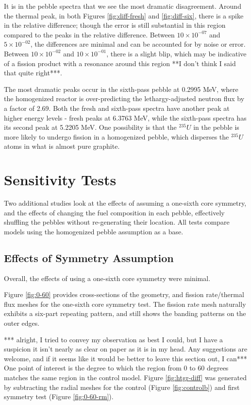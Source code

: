 It is in the pebble spectra that we see the most dramatic disagreement.  Around the thermal peak, in both Figures \ref{fig:diff-fresh} and \ref{fig:diff-six}, there is a spike in the relative difference; though the error is still substantial in this region compared to the peaks in the relative difference.  Between $10\times10^{-07}$ and $5\times10^{-02}$, the differences are minimal and can be accounted for by noise or error.  Between $10\times10^{-02}$ and $10\times10^{-01}$, there is a slight blip, which may be indicative of a fission product with a resonance around this region **I don't think I said that quite right***.

The most dramatic peaks occur in the sixth-pass pebble at 0.2995 MeV, where the homogenized reactor is over-predicting the lethargy-adjusted neutron flux by a factor of 2.69.  Both the fresh and sixth-pass spectra have another peak at higher energy levels - fresh peaks at 6.3763 MeV, while the sixth-pass spectra has its second peak at 5.2205 MeV.  One possibility is that the $^{235}U$ in the pebble is more likely to undergo fission in a homogenized pebble, which disperses the $^{235}U$ atoms in what is almost pure graphite.



\section{Sensitivity Tests}
Two additional studies look at the effects of assuming a one-sixth core symmetry, and the effects of changing the fuel composition in each pebble, effectively shuffling the pebbles without re-generating their location.  All tests compare models using the homogenized pebble assumption as a base.

\subsection{Effects of Symmetry Assumption}

Overall, the effects of using a one-sixth core symmetry were minimal.




Figure \ref{fig:0-60} provides cross-sections of the geometry, and fission rate/thermal flux meshes for the one-sixth core symmetry test.  The fission rate mesh naturally exhibits a six-part repeating pattern, and still shows the banding patterns on the outer edges. 



*** alright, I tried to convey my observation as best I could, but I have a suspicion it isn't nearly as clear on paper as it is in my head.  Any suggestions are welcome, and if it seems like it would be better to leave this section out, I can***
One point of interest is the degree to which the region from 0 to 60 degrees matches the same region in the control model.  Figure \ref{fig:htgr-diff} was generated by subtracting the radial meshes for the control (Figure \ref{fig:controlb}) and first symmetry test (Figure \ref{fig:0-60-rm}).


